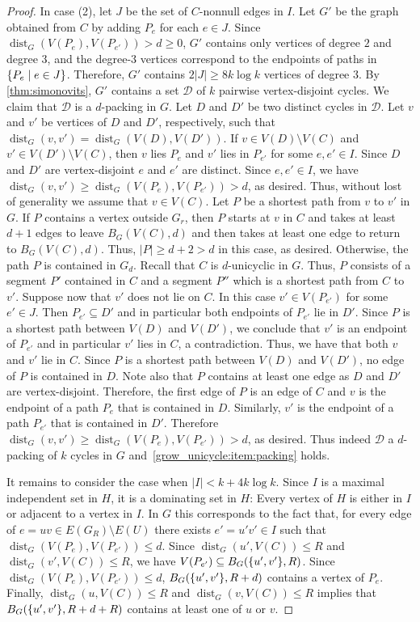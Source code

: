 \documentclass{patmorin}
\DeclareMathOperator{\dist}{dist}
\DeclarePairedDelimiter\set{\{}{\}}
\begin{document}
\begin{proof}
  In case (2), let $J$ be the set of $C$-nonnull edges in $I$.
  Let $G'$ be the graph obtained from $C$ by adding $P_e$ for each $e\in J$.
  Since $\dist_G(V(P_e),V(P_{e'}))>d\ge0$, $G'$ contains only vertices of degree $2$ and degree $3$, and the degree-$3$ vertices correspond to the endpoints of paths in $\set{P_e \mid e\in J}$.
  Therefore, $G'$ contains $2|J|\geq 8k\log k$ vertices of degree $3$.
  By \cref{thm:simonovits}, $G'$ contains a set $\mathcal{D}$ of $k$ pairwise vertex-disjoint cycles.
  We claim that $\mathcal{D}$ is a $d$-packing in $G$.
  Let $D$ and $D'$ be two distinct cycles in $\mathcal{D}$.
  Let $v$ and $v'$ be vertices of $D$ and $D'$, respectively,
  such that $\dist_G(v,v')=\dist_G(V(D),V(D'))$.
  If $v\in V(D)\setminus V(C)$ and $v'\in V(D')\setminus V(C)$, then
  $v$ lies $P_e$ and $v'$ lies in $P_{e'}$ for some  $e,e' \in I$.
  Since $D$ and $D'$ are vertex-disjoint $e$ and $e'$ are distinct.
  Since $e,e'\in I$, we have $\dist_G(v,v') \geq \dist_G(V(P_e),V(P_{e'}))>d$, as desired.
  Thus, without lost of generality we assume that $v \in V(C)$.
  Let $P$ be a shortest path from $v$ to $v'$ in $G$.
  If $P$ contains a vertex outside $G_r$, then
  $P$ starts at $v$ in $C$ and takes at least $d+1$ edges to leave $B_G(V(C),d)$ and then takes at least one edge to return to $B_G(V(C),d)$.
  Thus, $|P|\geq d+2 > d$ in this case, as desired.
  Otherwise, the path $P$ is contained in $G_d$.
  Recall that $C$ is $d$-unicyclic in $G$.
  Thus, $P$ consists of a segment $P'$ contained in $C$ and a segment $P''$ which is a shortest path from $C$ to $v'$.
  Suppose now that $v'$ does not lie on $C$.
  In this case $v' \in V(P_{e'})$ for some $e'\in J$.
  Then $P_{e'}\subseteq D'$ and in particular both endpoints of $P_{e'}$ lie in $D'$.
  Since $P$ is a shortest path between $V(D)$ and $V(D')$,
  we conclude that $v'$ is an endpoint of $P_{e'}$ and in particular $v'$ lies in $C$, a contradiction.
  Thus, we have that both $v$ and $v'$ lie in $C$.
  Since $P$ is a shortest path between $V(D)$ and $V(D')$, no edge of $P$ is contained in $D$. Note also that $P$ contains at least one edge as $D$ and $D'$ are vertex-disjoint. Therefore, the first edge of $P$ is an edge of $C$ and $v$ is the endpoint of a path $P_e$ that is contained in $D$. Similarly, $v'$ is the endpoint of a path $P_{e'}$ that is contained in $D'$. Therefore $\dist_G(v,v')\ge \dist_G(V(P_e),V(P_{e'}))>d$, as desired.
  Thus indeed $\mathcal{D}$ a $d$-packing of  $k$ cycles in $G$ and~\eqref{grow_unicycle:item:packing} holds.

  It remains to consider the case when $|I| < k+4k\log k$.
  Since $I$ is a maximal independent set in $H$, it is a dominating set in $H$: Every vertex of $H$ is either in $I$ or adjacent to a vertex in $I$.  In $G$ this corresponds to the fact that, for every edge of $e=uv\in E(G_R)\setminus E(U)$ there exists $e'=u'v'\in I$ such that $\dist_G(V(P_{e}),V(P_{e'}))\le d$.
  Since $\dist_G(u',V(C))\leq R$ and $\dist_G(v',V(C))\leq R$,
  we have $V(P_{e'}) \subseteq B_G(\set{u',v'},R)$. Since $\dist_G(V(P_e),V(P_{e'}))\le d$,  $B_G(\set{u',v'},R+d)$ contains a vertex of $P_e$.
  Finally, $\dist_G(u,V(C))\leq R$ and $\dist_G(v,V(C))\leq R$ implies that
  $B_{G}(\set{u',v'},R+d+R)$ contains at least one of $u$ or $v$.


\end{proof}
\end{document}
